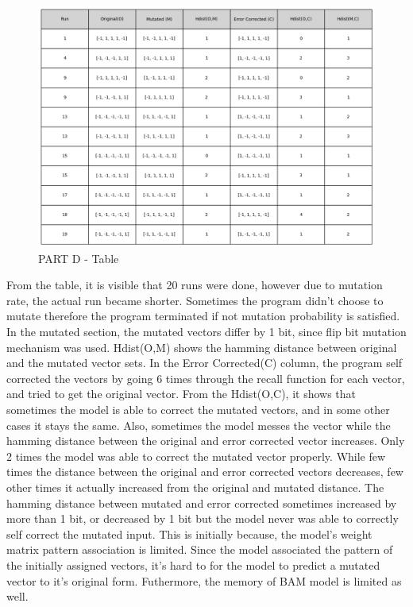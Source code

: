 \documentclass[12pt]{article}
\begin{document}
\begin{figure}[ht]
    \includegraphics[height=0.5\textheight]{Table.png} %
    \caption{PART D - Table}
    \label{fig:my_image}
\end{figure}

From the table, it is visible that 20 runs were done, however due to mutation rate, the actual run became shorter. Sometimes the program didn't choose to mutate therefore the program terminated if not mutation probability is satisfied. In the mutated section, the mutated vectors differ by 1 bit, since flip bit mutation mechanism was used. Hdist(O,M) shows the hamming distance between original and the mutated vector sets. In the Error Corrected(C) column, the program self corrected the vectors by going 6 times through the recall function for each vector, and tried to get the original vector. From the Hdist(O,C), it shows that sometimes the model is able to correct the mutated vectors, and in some other cases it stays the same. Also, sometimes the model messes the vector while the hamming distance between the original and error corrected vector increases. Only 2 times the model was able to correct the mutated vector properly. While few times the distance between the original and error corrected vectors decreases, few other times it actually increased from the original and mutated distance. The hamming distance between mutated and error corrected sometimes increased by more than 1 bit, or decreased by 1 bit but the model never was able to correctly self correct the mutated input. This is initially because, the model's weight matrix pattern association is limited. Since the model associated the pattern of the initially assigned vectors, it's hard to for the model to predict a mutated vector to it's original form. Futhermore, the memory of BAM model is limited as well.
\end{document}
